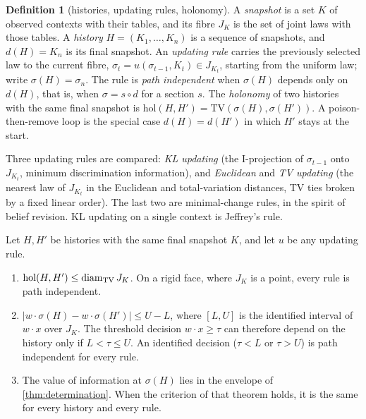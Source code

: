 \documentclass[11pt]{article}
\theoremstyle{definition}\newtheorem{definition}[theorem]{Definition}\newtheorem{remark}[theorem]{Remark}\newtheorem{example}[theorem]{Example}\newtheorem{problem}[theorem]{Open problem}\crefname{problem}{Problem}{Problems}
\begin{document}
\begin{definition}[histories, updating rules, holonomy]\label{def:history}
A \emph{snapshot} is a set $K$ of observed contexts with their tables, and its fibre $J_K$ is the set of joint laws with those tables. A \emph{history} $H=(K_1,\dots,K_n)$ is a sequence of snapshots, and $d(H)=K_n$ is its final snapshot. An \emph{updating rule} carries the previously selected law to the current fibre, $\sigma_t=u(\sigma_{t-1},K_t)\in J_{K_t}$, starting from the uniform law; write $\sigma(H)=\sigma_n$. The rule is \emph{path independent} when $\sigma(H)$ depends only on $d(H)$, that is, when $\sigma=s\circ d$ for a section $s$. The \emph{holonomy} of two histories with the same final snapshot is $\mathrm{hol}(H,H')=\mathrm{TV}(\sigma(H),\sigma(H'))$. A poison-then-remove loop is the special case $d(H)=d(H')$ in which $H'$ stays at the start.
\end{definition}

Three updating rules are compared: \emph{KL updating} (the I-projection of $\sigma_{t-1}$ onto $J_{K_t}$, minimum discrimination information), and \emph{Euclidean} and \emph{TV updating} (the nearest law of $J_{K_t}$ in the Euclidean and total-variation distances, TV ties broken by a fixed linear order). The last two are minimal-change rules, in the spirit of belief revision. KL updating on a single context is Jeffrey's rule.

\begin{proposition}\label{prop:holbound}
Let $H,H'$ be histories with the same final snapshot $K$, and let $u$ be any updating rule.
\begin{enumerate}
\item[(1)] $\mathrm{hol}(H,H')\le\operatorname{diam}_{\rm TV}J_K$. On a rigid face, where $J_K$ is a point, every rule is path independent.
\item[(2)] $|w\cdot\sigma(H)-w\cdot\sigma(H')|\le U-L$, where $[L,U]$ is the identified interval of $w\cdot x$ over $J_K$. The threshold decision $w\cdot x\ge\tau$ can therefore depend on the history only if $L<\tau\le U$. An identified decision ($\tau<L$ or $\tau>U$) is path independent for every rule.
\item[(3)] The value of information at $\sigma(H)$ lies in the envelope of \cref{thm:determination}. When the criterion of that theorem holds, it is the same for every history and every rule.
\end{enumerate}
\end{proposition}
\end{document}
